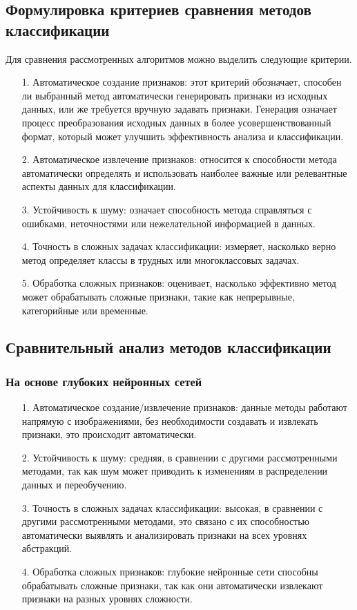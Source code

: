 \subsection{Формулировка критериев сравнения методов классификации}
Для сравнения рассмотренных алгоритмов можно выделить следующие критерии.
\begin{itemize}[leftmargin=1.6\parindent]
	\item[1.] Автоматическое создание признаков: этот критерий обозначает, способен ли выбранный метод автоматически генерировать признаки из исходных данных, или же требуется вручную задавать признаки. Генерация означает процесс преобразования исходных данных в более усовершенствованный формат, который может улучшить эффективность анализа и классификации.
	\item[2.] Автоматическое извлечение признаков: относится к способности метода автоматически определять и использовать наиболее важные или релевантные аспекты данных для классификации.
	\item[3.] Устойчивость к шуму: означает способность метода справляться с \\ошибками, неточностями или нежелательной информацией в данных.
	\item[4.] Точность в сложных задачах классификации:  измеряет, насколько верно метод определяет классы в трудных или многоклассовых задачах.
	\item[5.] Обработка сложных признаков: оценивает, насколько эффективно метод может обрабатывать сложные признаки, такие как непрерывные, категорийные или временные.
\end{itemize}


\subsection{Сравнительный анализ методов классификации}
\subsubsection*{На основе глубоких нейронных сетей}
\begin{itemize}[leftmargin=1.6\parindent]
	\item[1.] Автоматическое создание/извлечение признаков: данные методы работают напрямую с изображениями, без необходимости создавать и извлекать признаки, это происходит автоматически.
	\item[2.] Устойчивость к шуму:  средняя, в сравнении с другими рассмотренными методами, так как шум может приводить к изменениям в распределении данных и переобучению.
	\item[3.] Точность в сложных задачах классификации: высокая, в сравнении с другими рассмотренными методами, это связано с их способностью автоматически выявлять и анализировать признаки на всех уровнях абстракций.
	\item[4.] Обработка сложных признаков: глубокие нейронные сети способны обрабатывать сложные признаки, так как они автоматически извлекают признаки на разных уровнях сложности.
\end{itemize}

